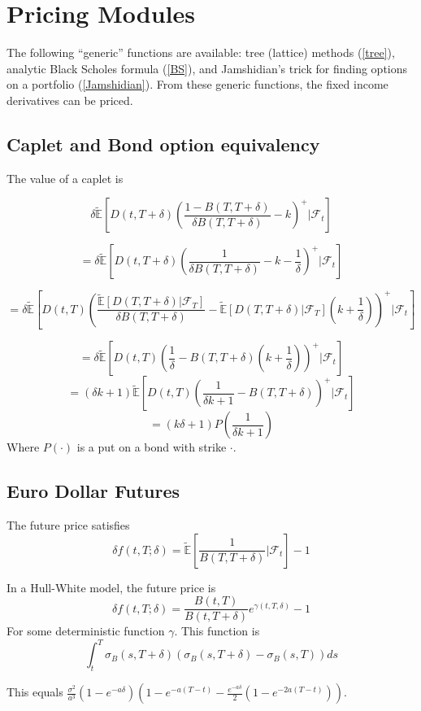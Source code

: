 \documentclass{article}
\theoremstyle{definition}
\begin{document}
\section{Pricing Modules}
The following ``generic'' functions are available: tree (lattice) methods (\ref{tree}), analytic Black Scholes formula (\ref{BS}), and Jamshidian's trick for finding options on a portfolio (\ref{Jamshidian}). From these generic functions, the fixed income derivatives can be priced. 
\subsection{Caplet and Bond option equivalency}
 The value of a caplet is 
  
\[\delta\mathbb{\tilde{E}}\left[D(t, T+\delta)\left(\frac{1-B(T, T+\delta)}{\delta B(T, T+\delta)}-k\right)^+ |\mathcal{F}_t\right]\]

\[=\delta\mathbb{\tilde{E}}\left[D(t, T+\delta)\left(\frac{1}{\delta B(T, T+\delta)}-k-\frac{1}{\delta}\right)^+ |\mathcal{F}_t\right]\]
 
\[=\delta\mathbb{\tilde{E}}\left[D(t, T)\left(\frac{ \mathbb{\tilde{E}}[D(T, T+\delta)|\mathcal{F}_T]}{\delta B(T, T+\delta)}-\mathbb{\tilde{E}}[D(T, T+\delta)|\mathcal{F}_T]\left(k+\frac{1}{\delta}\right)\right)^+ |\mathcal{F}_t\right]\]

\[=\delta\mathbb{\tilde{E}}\left[D(t, T)\left(\frac{1}{\delta}-B(T, T+\delta)\left(k+\frac{1}{\delta}\right)\right)^+ |\mathcal{F}_t\right]\]
\[=\left(\delta k+1\right)\mathbb{\tilde{E}}\left[D(t, T)\left(\frac{1}{\delta k+1}-B(T, T+\delta)\right)^+ |\mathcal{F}_t\right]\]
\[=\left(k\delta+1\right)P\left(\frac{1}{\delta k +1}\right)\] Where \(P(\cdot)\) is a put on a bond with strike \(\cdot\).

\subsection{Euro Dollar Futures}
The future price satisfies \[\delta f(t, T; \delta)=\tilde{\mathbb{E}}\left[\frac{1}{B(T, T+\delta)}|\mathcal{F}_t\right]-1\]

In a Hull-White model, the future price is \[\delta f(t, T; \delta)=\frac{B(t, T)}{B(t, T+\delta)}e^{\gamma(t, T, \delta)}-1\]
For some deterministic function \(\gamma\).  This function is \[\int_t ^ T \sigma_B (s, T+\delta)\left(\sigma_B(s, T+\delta)-\sigma_B(s, T)\right)ds\]

This equals \(\frac{\sigma^2}{a^3}\left(1-e^{-a\delta}\right)\left(1-e^{-a(T-t)}-\frac{e^{-a\delta}}{2}\left(1-e^{-2a(T-t)}\right)\right)\).
\end{document}

